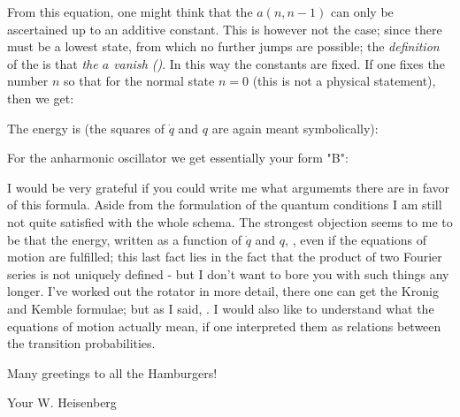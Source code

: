 From this equation, one might think that the $a(n,n-1)$ can only be ascertained up to an additive constant. This is however not the case; since there must be a lowest state, from which no further jumps are possible; the \textit{definition} of the  is that \textit{the $a$ vanish ()}. In this way the constants are fixed. If one fixes the number $n$ so that for the normal state $n=0$ (this is not a physical statement), then we get:

The energy is (the squares of $\dot{q}$ and $q$ are again meant symbolically):

For the anharmonic oscillator we get essentially your form "B":

I would be very grateful if you could write me what argumemts there are in favor of this formula. Aside from the formulation of the quantum conditions I am still not quite satisfied with the whole schema. The strongest objection seems to me to be that the energy, written as a function of $\dot{q}$ and $q$, , even if the equations of motion are fulfilled; this last fact lies in the fact that the product of two Fourier series is not uniquely defined - but I don't want to bore you with such things any longer. I've worked out the rotator in more detail, there one can get the Kronig and Kemble formulae; but as I said, . I would also like to understand what the equations of motion actually mean, if one interpreted them as relations between the transition probabilities.

Many greetings to all the Hamburgers!

Your W. Heisenberg